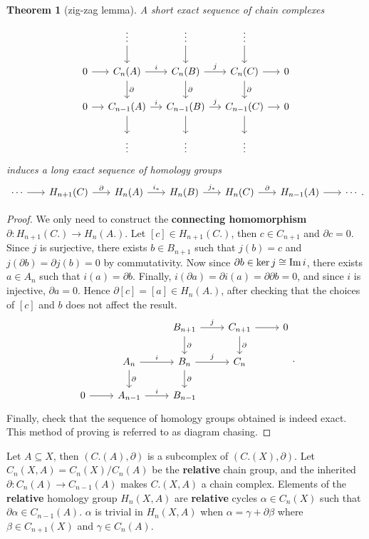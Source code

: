 \documentclass[11pt]{article}
\theoremstyle{definition}
\theoremstyle{plain}
\newtheorem{theorem}{Theorem}[section]
\theoremstyle{remark}
\newcommand{\im}{\textup{Im}\,}
\begin{document}
\begin{theorem}[zig-zag lemma]\label{zig-zag lemma}
A short exact sequence of chain complexes
\[\begin{tikzcd}[column sep=small]
&\vdots\arrow{d}&\vdots\arrow{d}&\vdots\arrow{d}\\
0\arrow{r}&C_n(A)\arrow{d}{\partial}\arrow{r}{i}&C_n(B)\arrow{d}{\partial}\arrow{r}{j}&C_n(C)\arrow{d}{\partial}\arrow{r}&0\\
0\arrow{r}&C_{n-1}(A)\arrow{d}\arrow{r}{i}&C_{n-1}(B)\arrow{d}\arrow{r}{j}&C_{n-1}(C)\arrow{d}\arrow{r}&0\\
&\vdots&\vdots&\vdots
\end{tikzcd}\]
induces a long exact sequence of homology groups
\[\begin{tikzcd}[column sep=scriptsize]
\cdots\arrow{r}&H_{n+1}(C)\arrow{r}{\partial}&H_n(A)\arrow{r}{i_\ast}&H_n(B)\arrow{r}{j_\ast}&H_n(C)\arrow{r}{\partial}&H_{n-1}(A)\arrow{r}&\cdots
\end{tikzcd}.\]
\end{theorem}
\begin{proof}
We only need to construct the \textbf{connecting homomorphism} $\partial:H_{n+1}(C.)\to H_n(A.)$. Let $[c]\in H_{n+1}(C.)$, then $c\in C_{n+1}$ and $\partial c=0$. Since $j$ is surjective, there exists $b\in B_{n+1}$ such that $j(b)=c$ and $j(\partial b)=\partial j(b)=0$ by commutativity. Now since $\partial b\in\ker j\cong\im i$, there exists $a\in A_n$ such that $i(a)=\partial b$. Finally, $i(\partial a)=\partial i(a)=\partial\partial b=0$, and since $i$ is injective, $\partial a=0$. Hence $\partial[c]=[a]\in H_n(A.)$, after checking that the choices of $[c]$ and $b$ does not affect the result.
\[\begin{tikzcd}
&&B_{n+1}\arrow{d}{\partial}\arrow{r}{j}&C_{n+1}\arrow{d}{\partial}\arrow{r}&0\\
&A_n\arrow{d}{\partial}\arrow{r}{i}&B_n\arrow{d}{\partial}\arrow{r}{j}&C_n\\
0\arrow{r}&A_{n-1}\arrow{r}{i}&B_{n-1}
\end{tikzcd}.\]
Finally, check that the sequence of homology groups obtained is indeed exact. This method of proving is referred to as diagram chasing.
\end{proof}

Let $A\subseteq X$, then $(C.(A),\partial)$ is a subcomplex of $(C.(X),\partial)$. Let $C_n(X,A)=C_n(X)/C_n(A)$ be the \textbf{relative} chain group, and the inherited $\partial:C_n(A)\to C_{n-1}(A)$ makes $C.(X,A)$ a chain complex. Elements of the \textbf{relative} homology group $H_n(X,A)$ are \textbf{relative} cycles $\alpha\in C_n(X)$ such that $\partial\alpha\in C_{n-1}(A)$. $\alpha$ is trivial in $H_n(X,A)$ when $\alpha=\gamma+\partial\beta$ where $\beta\in C_{n+1}(X)$ and $\gamma\in C_n(A)$.\medbreak
\end{document}
